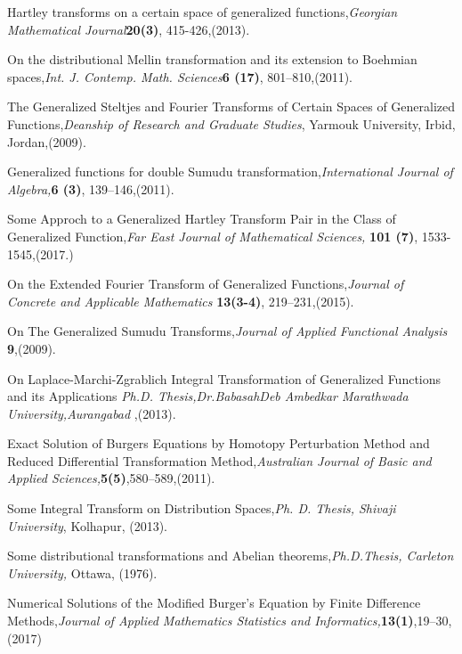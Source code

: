\begin{thebibliography}{00}
Hartley transforms on a certain space of generalized functions,{\it Georgian Mathematical Journal}{\bf 20(3)}, 415-426,(2013).

On the distributional Mellin transformation and its extension to Boehmian spaces,{\it Int. J. Contemp. Math. Sciences}{\bf 6 (17)}, 801--810,(2011).

The Generalized Steltjes and Fourier Transforms of Certain Spaces of Generalized Functions,{\it Deanship of Research and Graduate Studies}, Yarmouk University, Irbid, Jordan,(2009).

Generalized functions for double Sumudu transformation,{\it International Journal of Algebra,}{\bf 6 (3)}, 139--146,(2011).

Some Approch  to a  Generalized Hartley  Transform  Pair  in the Class of Generalized Function,{\it Far East Journal of Mathematical Sciences,} {\bf 101 (7)}, 1533-1545,(2017.)

On the Extended Fourier Transform of Generalized Functions,{\it Journal of Concrete and Applicable Mathematics} {\bf 13(3-4)}, 219--231,(2015).

On The Generalized Sumudu Transforms,{\it Journal of Applied Functional Analysis} {\bf 9},(2009).

On Laplace-Marchi-Zgrablich  Integral Transformation of Generalized Functions  and its Applications {\it Ph.D. Thesis,Dr.BabasahDeb Ambedkar Marathwada University,Aurangabad },(2013).

Exact Solution of Burgers Equations by Homotopy Perturbation Method and Reduced Differential Transformation Method,{\it Australian Journal of Basic and Applied Sciences,}{\bf 5(5)},580--589,(2011).

Some Integral Transform on Distribution Spaces,{\it Ph. D. Thesis, Shivaji University}, Kolhapur, (2013).

Some distributional transformations and Abelian theorems,{\it Ph.D.Thesis, Carleton University,} Ottawa, (1976).

Numerical Solutions of the Modified Burger's Equation by Finite Difference Methods,{\it Journal of Applied Mathematics Statistics and Informatics,}{\bf 13(1)},19--30,(2017)


\end{thebibliography}
